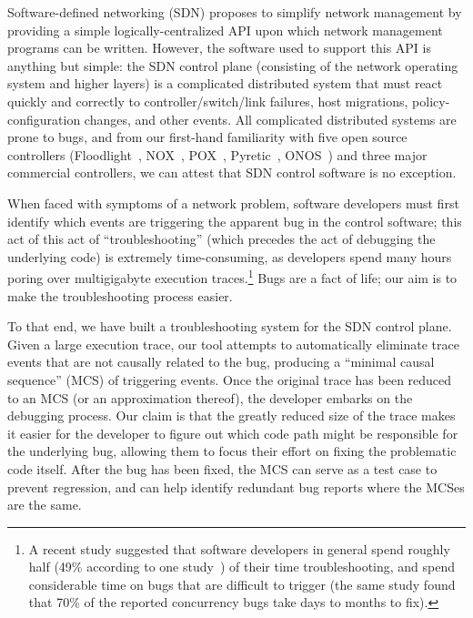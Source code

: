 Software-defined networking (SDN) proposes to simplify network management by
providing a simple logically-centralized API upon which network management
programs can be written. However, the software used to support this API is
anything but simple: the SDN control plane (consisting of the network
operating system and higher layers) is a complicated distributed system that
must react quickly and correctly to controller/switch/link failures, host migrations,
policy-configuration changes, and other events.
All complicated distributed systems are prone to bugs, and from our first-hand
familiarity with five open source controllers (Floodlight~\cite{floodlight}, NOX~\cite{nox},
POX~\cite{pox}, Pyretic~\cite{frenetic}, ONOS~\cite{ONOS}) and three major commercial
controllers, we can attest that SDN control software is no exception.

When faced with symptoms of a network problem,
software developers must first identify which events are triggering
the apparent bug in the control software; this act of this act of ``troubleshooting'' (which precedes the act of debugging the
underlying code) is extremely time-consuming, as developers spend many hours poring
over multigigabyte execution traces.\footnote{A recent study suggested that software developers in general spend roughly half (49\% according to one
study~\cite{msoft_concurrency}) of their time troubleshooting, and spend
considerable time on bugs that are difficult to trigger (the same study found
that 70\% of the reported concurrency bugs take days to months to fix).} Bugs
are a fact of life; our aim is to make the troubleshooting process easier.

To that end, we have built a troubleshooting system for the SDN control plane.
Given a large execution trace, our tool attempts to automatically eliminate
trace events that are not causally related to the bug, producing a ``minimal
causal sequence'' (MCS) of triggering events. Once the original trace has
been reduced to an MCS (or an approximation thereof), the developer embarks
on the debugging process. Our claim is that the greatly reduced size of the
trace makes it easier for the developer to figure out which code path might be
responsible for the underlying bug, allowing them to focus their effort on
fixing the problematic code itself. After the bug has been fixed, the MCS
can serve as a test case to prevent regression,
and can help identify redundant bug reports where the MCSes are the same.

